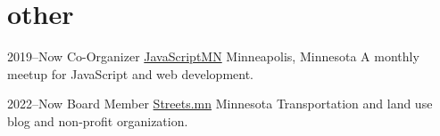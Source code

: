 \documentclass[]{cv-style} %
\begin{document}
\section{other}

\begin{entrylist}


\entry
{2019--Now}
{Co-Organizer {\normalfont \href{https://javascriptmn.com}{JavaScriptMN}}}
{Minneapolis, Minnesota}
{A monthly meetup for JavaScript and web development.}



\entry
{2022--Now}
{Board Member {\normalfont \href{https://streets.mn}{Streets.mn}}}
{Minnesota}
{Transportation and land use blog and non-profit organization.}


\end{entrylist}
\end{document}
